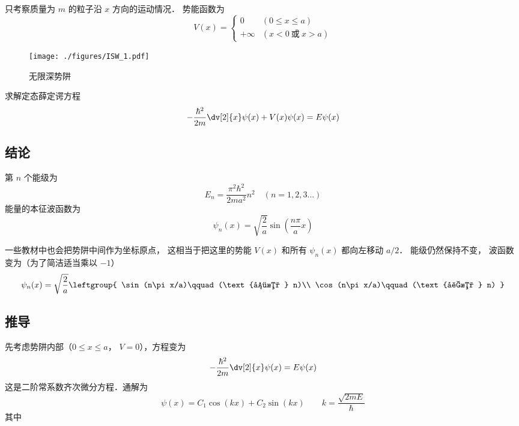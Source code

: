 

只考察质量为 $m$ 的粒子沿 $x$ 方向的运动情况．%
势能函数为
\begin{equation}
V(x) =
\begin{cases}
0 \quad &(0 \leqslant x \leqslant a)\\
+\infty  &(x < 0 \ \text{或}\  x > a)
\end{cases}
\end{equation}

\begin{figure}[ht]
\centering
\texttt{[image: ./figures/ISW\_1.pdf]}
\caption{无限深势阱} \label{ISW_fig1}
\end{figure}
求解定态薛定谔方程 %
\begin{equation}
-\frac{\hbar ^2}{2m} \dv[2]{x} \psi(x) + V(x)\psi(x) = E\psi(x)
\end{equation} 
\subsection{结论} 

第 $n$ 个能级为
\begin{equation}
E_n = \frac{\pi^2 \hbar^2}{2m a^2} n^2 \quad (n = 1,2,3...)
\end{equation}
能量的本征波函数为
\begin{equation}\label{ISW_eq1}
\psi_n(x) = \sqrt{\frac{2}{a}} \sin(\frac{n\pi }{a} x)
\end{equation}

一些教材中也会把势阱中间作为坐标原点， 这相当于把这里的势能 $V(x)$ 和所有 $\psi_n(x)$ 都向左移动 $a/2$． 能级仍然保持不变， 波函数变为（为了简洁适当乘以 $-1$）
\begin{equation}
\psi_n(x) = \sqrt{\frac{2}{a}}\leftgroup{
    \sin(n\pi x/a)\qquad (\text{偶数 } n)\\
    \cos(n\pi x/a)\qquad (\text{奇数 } n)
}
\end{equation}

\subsection{推导} 
先考虑势阱内部（$0 \leqslant x \leqslant a$， $V = 0$），方程变为
\begin{equation}
-\frac{\hbar^2}{2m} \dv[2]{x} \psi(x) = E\psi(x) 
\end{equation}
这是二阶常系数齐次微分方程．通解为
\begin{equation}
\psi(x) = C_1\cos(kx) + C_2 \sin(kx) \qquad
k = \frac{\sqrt{2mE}}{\hbar}
\end{equation} 
其中

